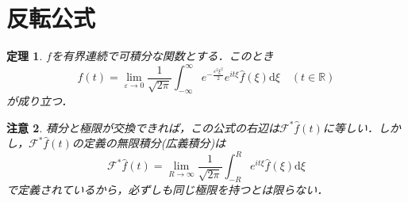 \documentclass[a4j]{jsbook}
\newtheorem{theorem}{定理}
\newtheorem{rem}[theorem]{注意}
\numberwithin{theorem}{chapter}  %
\begin{document}
\section{反転公式}
\begin{theorem}
\label{th3-3}
\(f\)を有界連続で可積分な関数とする．このとき
\begin{equation*}
    f(t)=\lim_{\varepsilon\to 0}\frac{1}{\sqrt{2\pi}}\int_{-\infty}^\infty e^{-\frac{\varepsilon^2\xi^2}{2}}e^{it\xi}\hat{f}(\xi)\mathrm{d}\xi\quad(t\in\mathbb{R})
\end{equation*}
が成り立つ．
\end{theorem}
\begin{rem}
\label{rem3-1}
積分と極限が交換できれば，この公式の右辺は\(\mathcal{F}^*\hat{f}(t)\)に等しい．しかし，\(\mathcal{F}^*\hat{f}(t)\)の定義の無限積分(広義積分)は
\begin{equation*}
    \mathcal{F}^*\hat{f}(t)=\lim_{R\to\infty}\frac{1}{\sqrt{2\pi}}\int_{-R}^R e^{it\xi}\hat{f}(\xi)\mathrm{d}\xi
\end{equation*}
で定義されているから，必ずしも同じ極限を持つとは限らない．
\end{rem}
\end{document}
